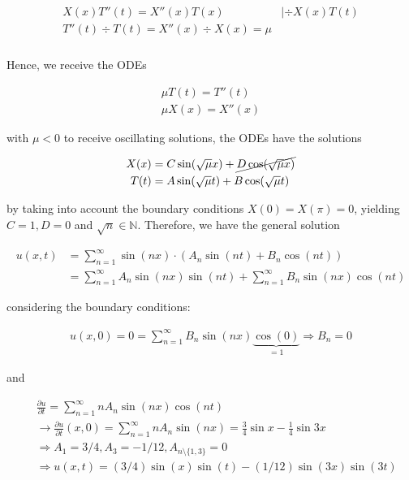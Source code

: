 \documentclass[10pt,landscape]{article}
\begin{document}
\begin{multicols}{3}
\begin{align*}
	\begin{matrix}
		X(x)T''(t)=X''(x)T(x) & |\div X(x)T(t) \\
		T''(t)\div T(t) = X''(x)\div X(x) = \mu
	\end{matrix} \\
\end{align*}

Hence, we receive the ODEs

\begin{align*}
	\mu T(t) = T''(t) \\
	\mu X(x) = X''(x)
\end{align*}

with $\mu < 0$ to receive oscillating solutions, the ODEs have the solutions

\begin{align*}
	X(x) & = C \sin(\sqrt\mu x)+\cancel{ D\cos(\sqrt\mu x) } \\
	T(t) & = A \sin(\sqrt\mu t)+B \cos(\sqrt\mu t)
\end{align*}

by taking into account the boundary conditions $X(0)=X(\pi)=0$, yielding $C=1,D=0$ and $\sqrt{n}\in\mathbb{N}$.
Therefore, we have the general solution

\begin{align*}
	u(x,t) & = \sum_{n=1}^\infty \sin(nx)\cdot\left( A_n\sin(nt)+B_n\cos(nt) \right) \\
	\ & = \sum_{n=1}^\infty A_n\sin(nx)\sin(nt) + \sum_{n=1}^\infty B_n\sin(nx)\cos(nt)
\end{align*}

considering the boundary conditions:

\begin{align*}
	u(x,0) = 0 = \sum_{n=1}^\infty B_n\sin(nx)\underbrace{\cos(0)}_{=1} \Rightarrow B_n=0
\end{align*}

and

\begin{align*}
	\ & \frac{\partial u}{\partial t} = \sum_{n=1}^\infty nA_n\sin(nx)\cos(nt)\\
	\ & \rightarrow \frac{\partial u}{\partial t}(x,0) = \sum_{n=1}^\infty nA_n\sin(nx) = \frac{3}{4}\sin x-\frac{1}{4}\sin 3x \\
	\ & \Rightarrow A_1=3/4, A_3=-1/12, A_{n\setminus \{1,3\}}=0 \\
	\ & \Rightarrow u(x,t)=(3/4)\sin(x)\sin(t)-(1/12)\sin(3x)\sin(3t)
\end{align*}


\end{multicols}
\end{document}

